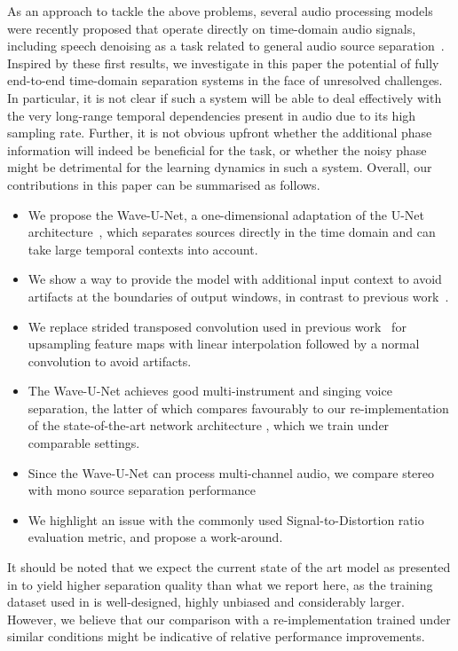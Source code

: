 \documentclass{article}
\begin{document}
As an approach to tackle the above problems, several audio processing models were recently proposed that operate directly on time-domain audio signals, including speech denoising as a task related to general audio source separation~\cite{Dieleman2016,Pascual2017,Rethage2017}.
Inspired by these first results, we investigate in this paper the potential of fully end-to-end time-domain separation systems in the face of unresolved challenges.
In particular, it is not clear if such a system will be able to deal effectively with the very long-range temporal dependencies present in audio due to its high sampling rate.
Further, it is not obvious upfront whether the additional phase information will indeed be beneficial for the task, or whether the noisy phase might be detrimental for the learning dynamics in such a system.
Overall, our contributions in this paper can be summarised as follows.
\begin{itemize}
\item{We propose the Wave-U-Net, a one-dimensional adaptation of the U-Net architecture~\cite{Ronneberger2015,Jansson2017}, which separates sources directly in the time domain and can take large temporal contexts into account.}
\item{We show a way to provide the model with additional input context to avoid artifacts at the boundaries of output windows, in contrast to previous work~\cite{Pascual2017,Jansson2017}.}
\item{We replace strided transposed convolution used in previous work~\cite{Jansson2017,Pascual2017} for upsampling feature maps with linear interpolation followed by a normal convolution to avoid artifacts.}
\item{The Wave-U-Net achieves good multi-instrument and singing voice separation, the latter of which compares favourably to our re-implementation of the state-of-the-art network architecture \cite{Jansson2017}, which we train under comparable settings.}
\item{Since the Wave-U-Net can process multi-channel audio, we compare stereo with mono source separation performance}
\item{We highlight an issue with the commonly used Signal-to-Distortion ratio evaluation metric, and propose a work-around.}
\end{itemize}

It should be noted that we expect the current state of the art model as presented in \cite{Jansson2017} to yield higher separation quality than what we report here, as the training dataset used in \cite{Jansson2017} is well-designed, highly unbiased and considerably larger. However, we believe that our comparison with a re-implementation trained under similar conditions might be indicative of relative performance improvements. 
\end{document}
